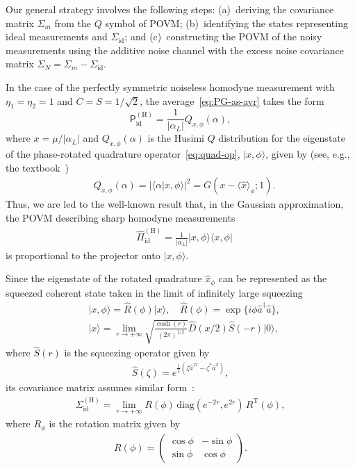 \documentclass[%
reprint,
superscriptaddress,
 amsmath,amssymb,amsfonts,
 aps,
 pra,
 longbibliography
]{revtex4-2}
\newcommand{\ket}[1]{\ensuremath{|{#1}\rangle}}
\newcommand{\avr}[1]{\ensuremath{\langle{#1}\rangle}}
\newcommand{\hcnj}[1]{{#1}^{\dagger}}
\newcommand{\tcnj}[1]{{#1}^{\mathrm{T}}}
\newcommand{\ind}[1]{\mathrm{#1}}
\newcommand{\prob}{\mathsf{P}}
\begin{document}
Our general strategy involves the following steps:
(a)~deriving the covariance matrix $\Sigma_m$ from
the $Q$ symbol of POVM;
(b)~identifying the states representing ideal measurements
and $\Sigma_{\ind{id}}$;
and (c)~constructing the POVM of the noisy measurements
using the additive noise channel with
the excess noise covariance matrix $\Sigma_N=\Sigma_m-\Sigma_{\ind{id}}$.

In the case of
the perfectly symmetric noiseless homodyne measurement with
$\eta_1=\eta_2=1$ and $C=S=1/\sqrt{2}$,
the average~\eqref{eq:PG-as-avr}
takes the form
\begin{equation}
    \label{eq:P_0}
    \prob_{\ind{id}}^{(\ind{H})}=
    \frac{1}{\left|\alpha_L\right|} Q_{x,\phi}(\alpha), 
  \end{equation}
  where
  $x=\mu/\left|\alpha_L\right|$
  and $Q_{x,\phi}(\alpha)$ is the Husimi $Q$ distribution
for the eigenstate of the phase-rotated quadrature
operator~\eqref{eq:quad-op},
$\ket{x,\phi}$,
given by (see, e.g., the textbook~\cite{Vogel:bk:2006})
\begin{align}
  &
    \label{eq:Q-x}
  Q_{x,\phi}(\alpha)=
    |\langle \alpha|x , \phi \rangle |^2 =G(x-\avr{\hat{x}}_\phi;1).
\end{align}
Thus, we are led to the well-known result that, in the Gaussian approximation,
the POVM describing sharp homodyne measurements
\begin{align}
  &
  \label{eq:POVM-P0}
    \hat{\Pi}_{\ind{id}}^{(\ind{H})}=\frac{1}{\left|\alpha_L\right|}|x,\phi\rangle\langle x,\phi|
\end{align}
 is proportional to
the projector onto $\ket{x,\phi}$.

Since the eigenstate of the rotated quadrature
$\hat{x}_\phi$ can be represented as
the squeezed coherent state
taken in the limit of infinitely large squeezing 
\begin{align}
  &
  \label{eq:ket-x-phi}
  \ket{x,\phi}=\hat{R}(\phi)\ket{x},
  \quad
  \hat{R}(\phi)=\exp\{i\phi\hcnj{\hat{a}}\hat{a}\},
  \\
  &
    \label{eq:ket-x}
  \ket{x}=\lim_{r\to+\infty}\sqrt{\frac{\cosh(r)}{(2\pi)^{1/2}}}\hat{D}(x/2)\hat{S}(-r)\ket{0},
\end{align}
where $\hat{S}(r)$ is the squeezing operator given by
\begin{align}
\label{eq:S-def}
    \hat{S}(\zeta)=e^{\frac{1}{2}\left(\zeta\hat{a}^{\dag2}-\zeta^*\hat{a}^2\right)},
\end{align}
its covariance matrix assumes similar form~\cite{Serafini:bk:2023}:
\begin{align}
  \label{eq:Sigma-H-0}
  \Sigma_{\ind{id}}^{\ind{(H)}}=\lim_{r\to+\infty}R(\phi)\,\ind{diag}(e^{-2r},e^{2r})\,\tcnj{R}(\phi),
\end{align}
where $R_\phi$ is the rotation matrix given by
\begin{align}
  \label{eq:rotation-matrix}
  R(\phi)=\begin{pmatrix}
    \cos\phi&-\sin\phi\\
    \sin\phi&\cos\phi
  \end{pmatrix}.
\end{align}
\end{document}
